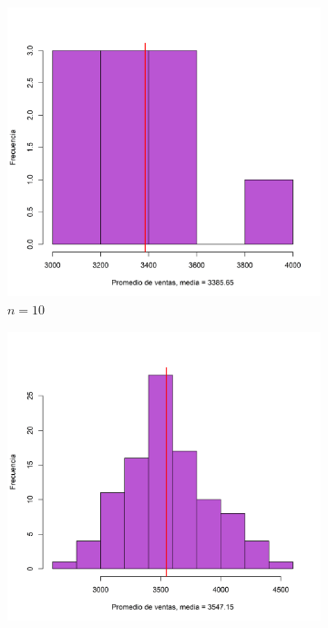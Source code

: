 \documentclass{article}
\begin{document}
\begin{figure}[h]
    \begin{center}
    \captionsetup{justification=centering}
    \begin{subfigure}[b]{0.5\textwidth}
        \includegraphics[scale=0.45]{Figures/10-30.png}
        \caption{$n=10$}
    \end{subfigure}
    \begin{subfigure}[b]{0.45\textwidth}
        \includegraphics[scale=0.45]{Figures/100-30.png}

\end{subfigure}
\end{center}
\end{figure}
\end{document}
